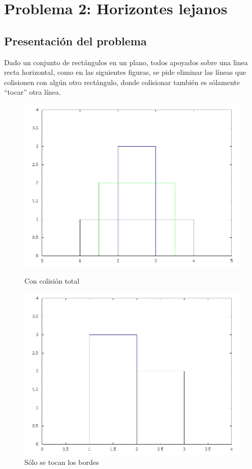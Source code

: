 \section{Problema 2: Horizontes lejanos}

\subsection{Presentaci\'on del problema}
Dado un conjunto de rectángulos en un plano, todos apoyados sobre una linea recta horizontal, como en las siguientes figuras, se pide eliminar las líneas que colisionen con algún otro rectángulo, donde colisionar también es sólamente ``tocar'' otra línea.
\begin{figure}[ht]
	\begin{minipage}[t]{0.5\linewidth}
		\centering
		\includegraphics[width=\textwidth]{p1_ej1_pre.jpg}
		\caption{Con colisión total}
		\label{fig:p1_ej1_pre}
	\end{minipage}
	\begin{minipage}[t]{0.5\linewidth}
		\centering
		\includegraphics[width=\textwidth]{p1_ej2_pre.jpg}
		\caption{Sólo se tocan los bordes}
		\label{fig:p1_ej2_pre}
	\end{minipage}
\end{figure}

